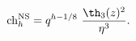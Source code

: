 \begin{equation} \label{massive-char}
  {\rm ch}^{\rm NS}_h = q^{h-1/8} ~{\th_3(z)^2\over \eta^3}.
\end{equation}

